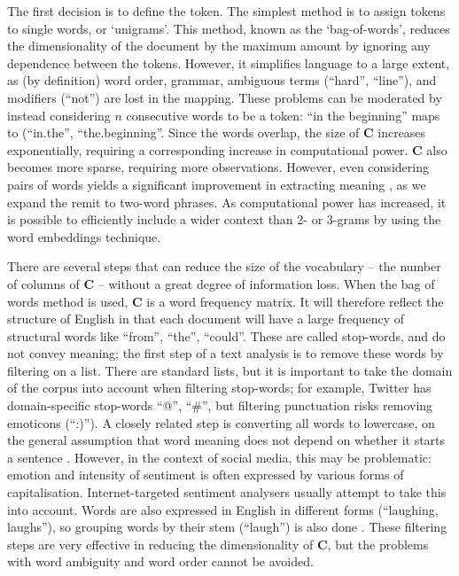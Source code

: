 \documentclass{article}
\begin{document}
The first decision is to define the token. The simplest method is to assign tokens to single words, or `unigrams'. This method, known as the `bag-of-words', reduces the dimensionality of the document by the maximum amount by ignoring any dependence between the tokens. However, it simplifies language to a large extent, as (by definition) word order, grammar, ambiguous terms (``hard'', ``line''), and modifiers (``not'') are lost in the mapping. These problems can be moderated by instead considering \(n\) consecutive words to be a token: ``in the beginning'' maps to (``in.the'', ``the.beginning''. Since the words overlap, the size of \(\mathbf{C}\) increases exponentially, requiring a corresponding increase in computational power. \(\mathbf{C}\) also becomes more sparse, requiring more observations. However, even considering pairs of words yields a significant improvement in extracting meaning \parencite{chengNgramSkipgramConcgram2006}, as we expand the remit to two-word phrases. As computational power has increased, it is possible to efficiently include a wider context than 2- or 3-grams by using the word embeddings technique.

There are several steps that can reduce the size of the vocabulary -- the number of columns of \(\mathbf{C}\) -- without a great degree of information loss. When the bag of words method is used, \(\mathbf{C}\) is a word frequency matrix. It will therefore reflect the structure of English in that each document will have a large frequency of structural words like ``from'', ``the'', ``could''. These are called stop-words, and do not convey meaning; the first step of a text analysis is to remove these words by filtering on a list. There are standard lists, but it is important to take the domain of the corpus into account when filtering stop-words; for example, Twitter has domain-specific stop-words ``@'', ``\#'', but filtering punctuation risks removing emoticons (``:)''). A closely related step is converting all words to lowercase, on the general assumption that word meaning does not depend on whether it starts a sentence \parencite{dennyTextPreprocessingUnsupervised2018}. However, in the context of social media, this may be problematic: emotion and intensity of sentiment is often expressed by various forms of capitalisation. Internet-targeted sentiment analysers usually attempt to take this into account. Words are also expressed in English in different forms (``laughing, laughs''), so grouping words by their stem (``laugh'') is also done \parencite{porterAlgorithmSuffixStripping1980}. These filtering steps are very effective in reducing the dimensionality of \(\mathbf{C}\), but the problems with word ambiguity and word order cannot be avoided.  
\end{document}
